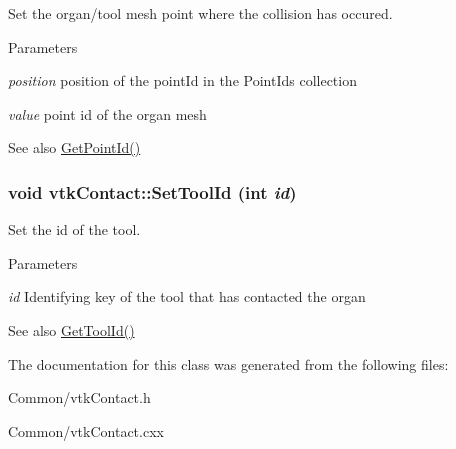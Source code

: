 Set the organ/tool mesh point where the collision has occured. 
\begin{DoxyParams}{Parameters}
\item[{\em position}]position of the pointId in the PointIds collection \item[{\em value}]point id of the organ mesh \end{DoxyParams}
\begin{DoxySeeAlso}{See also}
\hyperlink{classvtkContact_a4b404cb999cbe287f2ea6c386e34d0fd}{GetPointId()} 
\end{DoxySeeAlso}
\hypertarget{classvtkContact_a449bcc29dbf1e58dcd342d949a9754cb}{
\subsubsection[{SetToolId}]{\setlength{\rightskip}{0pt plus 5cm}void vtkContact::SetToolId (int {\em id})}}
\label{classvtkContact_a449bcc29dbf1e58dcd342d949a9754cb}


Set the id of the tool. 
\begin{DoxyParams}{Parameters}
\item[{\em id}]Identifying key of the tool that has contacted the organ \end{DoxyParams}
\begin{DoxySeeAlso}{See also}
\hyperlink{classvtkContact_a82d16317dbf303590a6d2834810b222c}{GetToolId()} 
\end{DoxySeeAlso}


The documentation for this class was generated from the following files:\begin{DoxyCompactItemize}
\item 
Common/vtkContact.h\item 
Common/vtkContact.cxx\end{DoxyCompactItemize}
